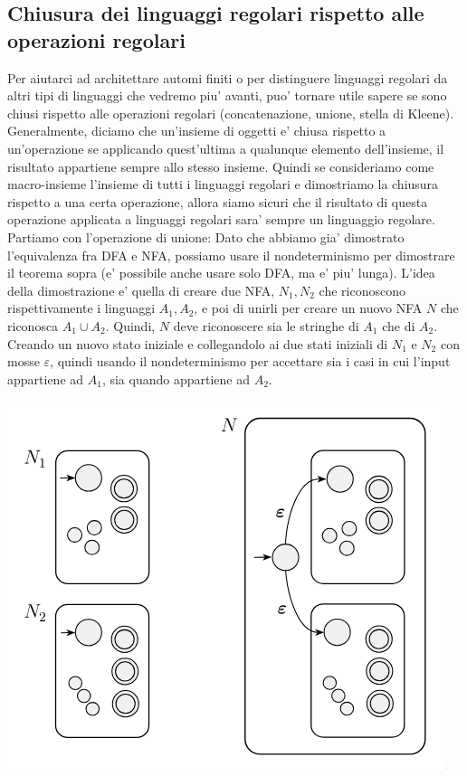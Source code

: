 \subsection{Chiusura dei linguaggi regolari rispetto alle operazioni regolari}
Per aiutarci ad architettare automi finiti o per distinguere linguaggi regolari da altri tipi di linguaggi che vedremo piu' avanti, puo' tornare utile sapere se sono chiusi rispetto alle operazioni regolari (concatenazione, unione, stella di Kleene). Generalmente, diciamo che un'insieme di oggetti e' chiusa rispetto a un'operazione se applicando quest'ultima a qualunque elemento dell'insieme, il risultato appartiene sempre allo stesso insieme. Quindi se consideriamo come macro-insieme l'insieme di tutti i linguaggi regolari e dimostriamo la chiusura rispetto a una certa operazione, allora siamo sicuri che il risultato di questa operazione applicata a linguaggi regolari sara' sempre un linguaggio regolare. Partiamo con l'operazione di unione:
Dato che abbiamo gia' dimostrato l'equivalenza fra DFA e NFA, possiamo usare il nondeterminismo per dimostrare il teorema sopra (e' possibile anche usare solo DFA, ma e' piu' lunga). L'idea della dimostrazione e' quella di creare due NFA, $ N_1, N_2 $ che riconoscono rispettivamente i linguaggi $ A_1, A_2 $, e poi di unirli per creare un nuovo NFA $ N $ che riconosca $ A_1 \cup A_2 $. Quindi, $ N $ deve riconoscere sia le stringhe di $ A_1 $ che di $ A_2 $. Creando un nuovo stato iniziale e collegandolo ai due stati iniziali di $ N_1 $ e $ N_2 $ con mosse $ \varepsilon $, quindi usando il nondeterminismo per accettare sia i casi in cui l'input appartiene ad $ A_1 $, sia quando appartiene ad $ A_2 $. 

\begin{center}
  \includegraphics[scale=0.3]{img/2024-12-16-18-34-40.png}
\end{center}

